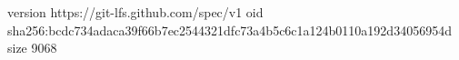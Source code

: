 version https://git-lfs.github.com/spec/v1
oid sha256:bcdc734adaca39f66b7ec2544321dfc73a4b5c6c1a124b0110a192d34056954d
size 9068
